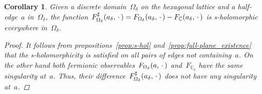 \documentclass[reqno,11pt,a4paper]{amsart}
\newtheorem{corollary}[proposition]{Corollary}
\theoremstyle{remark}
\newcommand{\C}{\mathbb{C}}
\begin{document}
\begin{corollary}
Given a discrete domain~$\Omega_\delta$ on the hexagonal lattice and a half-edge~$a$ in~$\Omega_\delta$,
the function~$\Fdelta^\sharp(a_\delta,\,\cdot\,) = \Fdelta(a_\delta,\,\cdot\,) - F_\C(a_\delta,\, \cdot \,)$
is s-holomorphic everywhere in~$\Omega_\delta$.

\begin{proof}
It follows from propositions~\ref{prop:s-hol} and~\ref{prop:full-plane_existence} that the s-holomorphicity
is satisfied on all pairs of edges not containing~$a$.
On the other hand both fermionic observables~$F_{\Omega_\delta} (a, \,\cdot\,)$ and~$F_{\C_\delta}$ have the same singularity at~$a$.
Thus, their difference~$F_{\Omega_\delta}^\sharp(a_\delta,\,\cdot\,)$ does not have any singularity at~$a$.
\end{proof}
\end{corollary}
\end{document}
